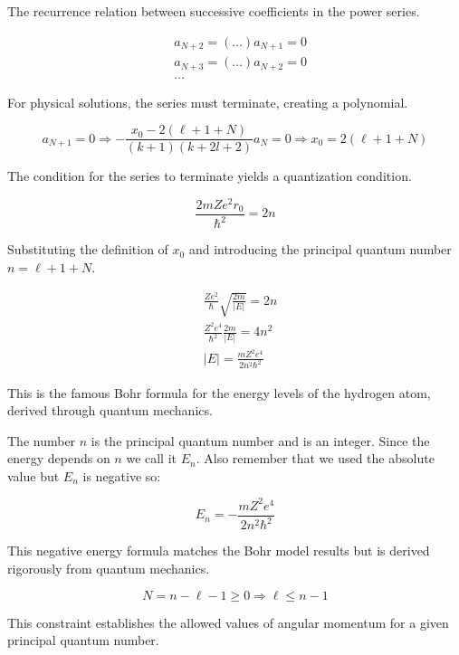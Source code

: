 \documentclass[italian]{HKNdocument}
\begin{document}
The recurrence relation between successive coefficients in the power series.

\begin{align}
& a_{N+2}=(\ldots) a_{N+1}=0 \\
& a_{N+3}=(\ldots) a_{N+2}=0  \\
& \ldots
\end{align}

For physical solutions, the series must terminate, creating a polynomial.

\begin{equation}
a_{N+1}=0 \Longrightarrow-\frac{x_{0}-2(\ell+1+N)}{(k+1)(k+2 l+2)} a_{N}=0 \Longrightarrow x_{0}=2(\ell+1+N)
\end{equation}

The condition for the series to terminate yields a quantization condition.

\begin{equation}
\frac{2 m Z e^{2} r_{0}}{\hbar^{2}}=2 n
\end{equation}

Substituting the definition of $x_0$ and introducing the principal quantum number $n = \ell+1+N$.

\begin{align}
& \frac{Z e^{2}}{\hbar} \sqrt{\frac{2 m}{|E|}}=2 n \\
& \frac{Z^{2} e^{4}}{\hbar^{2}} \frac{2 m}{|E|}=4 n^{2}  \\
& |E|=\frac{m Z^{2} e^{4}}{2 n^{2} \hbar^{2}}
\end{align}

This is the famous Bohr formula for the energy levels of the hydrogen atom, derived through quantum mechanics.

The number $n$ is the principal quantum number and is an integer. Since the energy depends on $n$ we call it $E_{n}$. Also remember that we used the absolute value but $E_{n}$ is negative so:

\begin{equation}
E_{n}=-\frac{m Z^{2} e^{4}}{2 n^{2} \hbar^{2}}
\end{equation}

This negative energy formula matches the Bohr model results but is derived rigorously from quantum mechanics.

\begin{equation}
N=n-\ell-1 \geq 0 \Longrightarrow \ell \leq n-1
\end{equation}

This constraint establishes the allowed values of angular momentum for a given principal quantum number.
\end{document}
